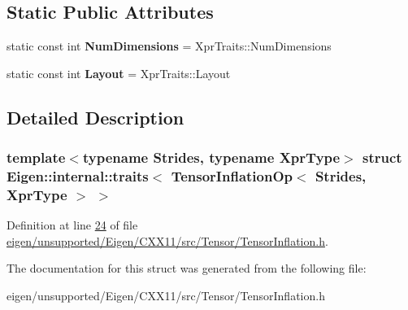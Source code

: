 \subsection*{Static Public Attributes}
\begin{DoxyCompactItemize}
\item 
\mbox{\label{struct_eigen_1_1internal_1_1traits_3_01_tensor_inflation_op_3_01_strides_00_01_xpr_type_01_4_01_4_a88d908bcc88e7a7e97887a8b65295555}} 
static const int {\bfseries Num\+Dimensions} = Xpr\+Traits\+::\+Num\+Dimensions
\item 
\mbox{\label{struct_eigen_1_1internal_1_1traits_3_01_tensor_inflation_op_3_01_strides_00_01_xpr_type_01_4_01_4_aed0987fee4d131e18adb278f23a9e756}} 
static const int {\bfseries Layout} = Xpr\+Traits\+::\+Layout
\end{DoxyCompactItemize}


\subsection{Detailed Description}
\subsubsection*{template$<$typename Strides, typename Xpr\+Type$>$\newline
struct Eigen\+::internal\+::traits$<$ Tensor\+Inflation\+Op$<$ Strides, Xpr\+Type $>$ $>$}



Definition at line \hyperlink{eigen_2unsupported_2_eigen_2_c_x_x11_2src_2_tensor_2_tensor_inflation_8h_source_l00024}{24} of file \hyperlink{eigen_2unsupported_2_eigen_2_c_x_x11_2src_2_tensor_2_tensor_inflation_8h_source}{eigen/unsupported/\+Eigen/\+C\+X\+X11/src/\+Tensor/\+Tensor\+Inflation.\+h}.



The documentation for this struct was generated from the following file\+:\begin{DoxyCompactItemize}
\item 
eigen/unsupported/\+Eigen/\+C\+X\+X11/src/\+Tensor/\+Tensor\+Inflation.\+h\end{DoxyCompactItemize}
